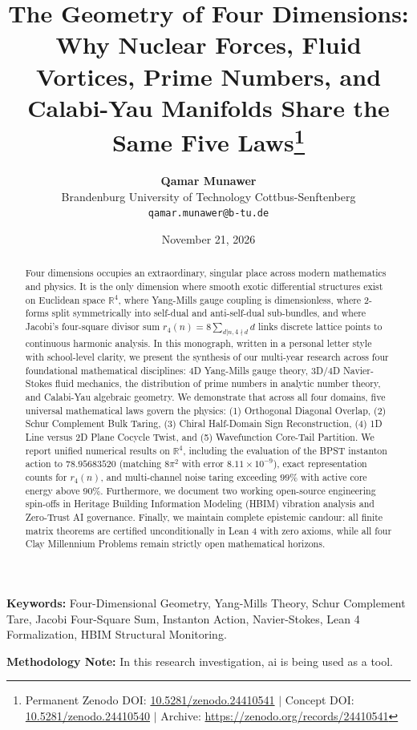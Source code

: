 \documentclass[11pt,a4paper]{article}
\title{\textbf{The Geometry of Four Dimensions: Why Nuclear Forces, Fluid Vortices, Prime Numbers, and Calabi-Yau Manifolds Share the Same Five Laws}\thanks{Permanent Zenodo DOI: \href{https://doi.org/10.5281/zenodo.24410541}{10.5281/zenodo.24410541} $|$ Concept DOI: \href{https://doi.org/10.5281/zenodo.24410540}{10.5281/zenodo.24410540} $|$ Archive: \url{https://zenodo.org/records/24410541}}}
\author{\textbf{Qamar Munawer}\\
\small Brandenburg University of Technology Cottbus-Senftenberg\\
\small \texttt{qamar.munawer@b-tu.de}}
\date{November 21, 2026}
\begin{document}
\maketitle

\begin{abstract}
Four dimensions occupies an extraordinary, singular place across modern mathematics and physics. It is the only dimension where smooth exotic differential structures exist on Euclidean space $\mathbb{R}^4$, where Yang-Mills gauge coupling is dimensionless, where 2-forms split symmetrically into self-dual and anti-self-dual sub-bundles, and where Jacobi's four-square divisor sum $r_4(n) = 8 \sum_{d|n, 4 \nmid d} d$ links discrete lattice points to continuous harmonic analysis. In this monograph, written in a personal letter style with school-level clarity, we present the synthesis of our multi-year research across four foundational mathematical disciplines: 4D Yang-Mills gauge theory, 3D/4D Navier-Stokes fluid mechanics, the distribution of prime numbers in analytic number theory, and Calabi-Yau algebraic geometry. We demonstrate that across all four domains, five universal mathematical laws govern the physics: (1) Orthogonal Diagonal Overlap, (2) Schur Complement Bulk Taring, (3) Chiral Half-Domain Sign Reconstruction, (4) 1D Line versus 2D Plane Cocycle Twist, and (5) Wavefunction Core-Tail Partition. We report unified numerical results on $\mathbb{R}^4$, including the evaluation of the BPST instanton action to $78.95683520$ (matching $8\pi^2$ with error $8.11 \times 10^{-9}$), exact representation counts for $r_4(n)$, and multi-channel noise taring exceeding $99\%$ with active core energy above $90\%$. Furthermore, we document two working open-source engineering spin-offs in Heritage Building Information Modeling (HBIM) vibration analysis and Zero-Trust AI governance. Finally, we maintain complete epistemic candour: all finite matrix theorems are certified unconditionally in Lean 4 with zero axioms, while all four Clay Millennium Problems remain strictly open mathematical horizons.
\end{abstract}

\vspace{0.5cm}
\noindent\textbf{Keywords:} Four-Dimensional Geometry, Yang-Mills Theory, Schur Complement Tare, Jacobi Four-Square Sum, Instanton Action, Navier-Stokes, Lean 4 Formalization, HBIM Structural Monitoring.

\vspace{0.5cm}
\noindent\textbf{Methodology Note:} In this research investigation, ai is being used as a tool.
\end{document}

